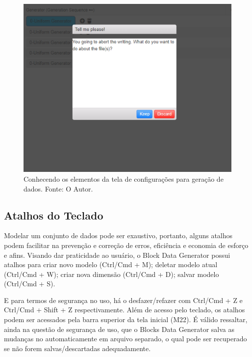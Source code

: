 \documentclass[
	12pt,				%
	openright,			%
	twoside,			%
	a4paper,			%
	english,			%
	brazil				%
	]{abntex2}
\begin{document}
		\begin{figure}[h]
			\centering
			\includegraphics[width=\linewidth]{./figures/prototipo/modal.png}
			\caption{Conhecendo os elementos da tela de configurações para geração de dados. Fonte: O Autor.}
			\label{fig:modal}
		\end{figure}
		\subsection{Atalhos do Teclado}
		Modelar um conjunto de dados pode ser exaustivo, portanto, alguns atalhos podem facilitar na prevenção e correção de erros, eficiência e economia de esforço e afins.
		Visando dar praticidade ao usuário, o Block Data Generator possui atalhos para 
			criar novo modelo (Ctrl/Cmd + M);
			deletar modelo atual (Ctrl/Cmd + W);
			criar nova dimensão (Ctrl/Cmd + D);
			salvar modelo (Ctrl/Cmd + S).
		\par
		E para termos de segurança no uso, há o desfazer/refazer com Ctrl/Cmd + Z e Ctrl/Cmd + Shift + Z respectivamente.
		Além de acesso pelo teclado, os atalhos podem ser acessados pela barra superior da tela inicial (M22).
		É válido ressaltar, ainda na questão de segurança de uso, que o Blocks Data Generator salva as mudanças no automaticamente em arquivo separado, o qual pode ser recuperado se não forem salvas/descartadas adequadamente. 

\end{document}
